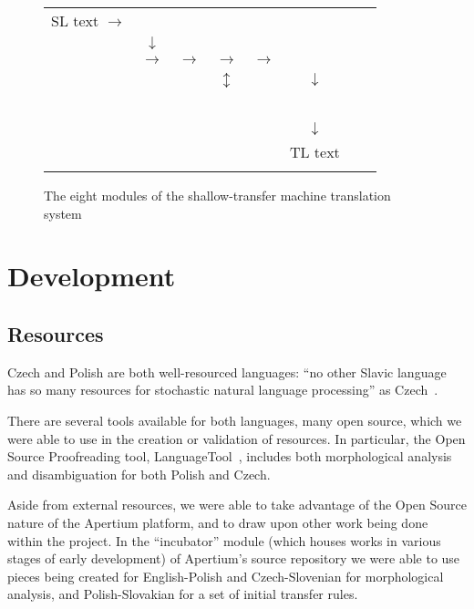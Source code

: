\documentclass[11pt]{article}
\begin{document}
\begin{figure*} {\small \setlength{\tabcolsep}{0.5mm}
\begin{center}
\begin{tabular}{cccccccc}
\\
\parbox{1.2cm}{SL text} $\rightarrow$ &  \\ 
& $\downarrow$ \\
&   $\rightarrow$ &  $\rightarrow$ &  $\rightarrow$ &   $\rightarrow$ &  & & \\
& \parbox{1.3cm}{~} & \parbox{1.1cm}{~}  & $\updownarrow$ & & $\downarrow$ & &   \\
& \parbox{1.3cm}{~} & \parbox{1.1cm}{~}  &  & &  \\
& & & & &  $\downarrow$ \\
& & & & &  \parbox{1.2cm}{TL text}\\\\
\end{tabular}
\end{center} }
\caption{The eight modules of the shallow-transfer machine translation system}
\label{fig:apertium}
\end{figure*}

\section{Development}

\subsection{Resources}

Czech and Polish are both well-resourced languages: 
``no other Slavic language has so many resources for
stochastic natural language processing'' as Czech~\citep{Hajic03}. 

There are several tools available for both languages, many open source, 
which we were able to use in the creation or validation of resources.
In particular, the Open Source Proofreading tool, LanguageTool~\citep{Milkowski10},
includes both morphological analysis and disambiguation for both Polish and
Czech.

Aside from external resources, we were able to take advantage of the Open Source nature
of the Apertium platform, and to draw upon other work being done within the project. In 
the ``incubator'' module (which houses works in various stages of early development) of 
Apertium's source repository we were able to use pieces being created for English-Polish 
and Czech-Slovenian for morphological analysis, and Polish-Slovakian for a set of initial 
transfer rules.
\end{document}
